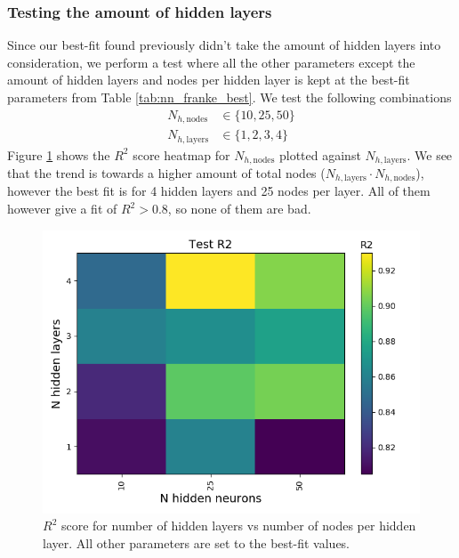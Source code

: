 \documentclass[a4paper]{article}
\newcommand{\Nhn}{N_{h,\text{nodes}}}
\newcommand{\Nhl}{N_{h,\text{layers}}}
\begin{document}
\subsubsection*{Testing the amount of hidden layers}
Since our best-fit found previously didn't take the amount of hidden layers into consideration, we perform a test where all the other parameters except the amount of hidden layers and nodes per hidden layer is kept at the best-fit parameters from Table \ref{tab:nn_franke_best}. We test the following combinations
\begin{align*}
	\Nhn &\in \{10, 25, 50\}\\
	\Nhl &\in \{1, 2, 3, 4\}
\end{align*}
Figure \ref{fig:nn_params_franke} shows the $R^2$ score heatmap for $\Nhn$ plotted against $\Nhl$. We see that the trend is towards a higher amount of total nodes ($\Nhl\cdot\Nhn$), however the best fit is for 4 hidden layers and 25 nodes per layer. All of them however give a fit of $R^2 > 0.8$, so none of them are bad.
\begin{figure}[H]
	\centering
	\includegraphics[scale=0.5]{../figures/task_b/nn_parameters/heatmap_nn_parameters_lr_constant_Nhyp111134_R2_nhn_nhl.png}
	\caption{$R^2$ score for number of hidden layers vs number of nodes per hidden layer. All other parameters are set to the best-fit values.}
	\label{fig:nn_params_franke}
\end{figure}
\end{document}

